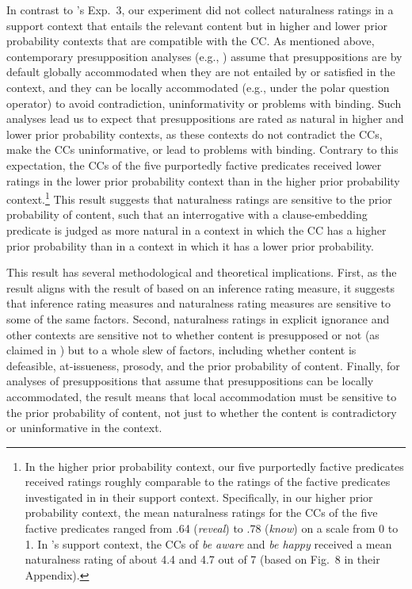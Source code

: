 \documentclass[11pt,fleqn]{article}
\newcommand{\6}{\mbox{$[\hspace*{-.6mm}[$}}
\newcommand{\9}{\mbox{$]\hspace*{-.6mm}]$}}
\newcommand{\citepos}[1]{\citeauthor{#1}'s \citeyear{#1}}
\begin{document}
In contrast to \citepos{mandelkern-etal2020} Exp.~3, our experiment did not collect naturalness ratings in a support context that entails the relevant content but in higher and lower prior probability contexts that are compatible with the CC. As mentioned above, contemporary presupposition analyses (e.g., \citealt{heim83,vds92}) assume that presuppositions are by default globally accommodated when they are not entailed by or satisfied in the context, and they can be locally accommodated (e.g., under the polar question operator) to avoid contradiction, uninformativity or problems with binding. Such analyses lead us to expect that presuppositions are rated as natural in higher and lower prior probability contexts, as these contexts do not contradict the CCs, make the CCs uninformative, or lead to problems with binding. Contrary to this expectation, the CCs of the five purportedly factive predicates received lower ratings in the lower prior probability context than in the higher prior probability context.\footnote{In the higher prior probability context, our five purportedly factive predicates received ratings roughly comparable to the ratings of the factive predicates investigated in \citealt{mandelkern-etal2020} in their support context. Specifically, in our higher prior probability context, the mean naturalness ratings for the CCs of the five factive predicates ranged from .64 ({\em reveal}) to .78 ({\em know}) on a scale from 0 to 1. In \citepos{mandelkern-etal2020} support context, the CCs of {\em be aware} and {\em be happy} received a mean naturalness rating of about 4.4 and 4.7 out of 7 (based on Fig.~8 in their Appendix).} This result suggests that naturalness ratings are sensitive to the prior probability of content, such that an interrogative with a clause-embedding predicate is judged as more natural in a context in which the CC has a higher prior probability than in a context in which it has a lower prior probability. 

This result has several methodological and theoretical implications. First, as the result aligns with the result of \citealt{degen-tonhauser-openmind} based on an inference rating measure, it suggests that inference rating measures and naturalness rating measures are sensitive to some of the same factors. Second, naturalness ratings in explicit ignorance and other contexts are sensitive not to whether content is presupposed or not (as claimed in \citealt{mandelkern-etal2020}) but to a whole slew of factors, including whether content is defeasible, at-issueness, prosody, and the prior probability of content. Finally, for analyses of presuppositions that assume that presuppositions can be locally accommodated, the result means that local accommodation must be sensitive to the prior probability of content, not just to whether the content is contradictory or uninformative in the context. 
\end{document}

